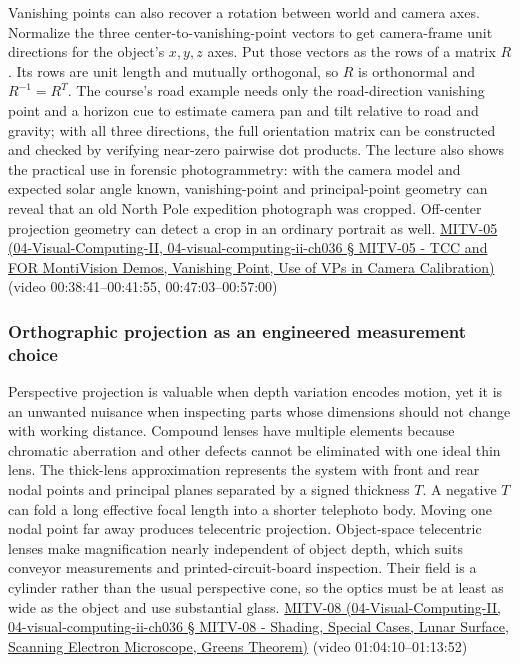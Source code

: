 Vanishing points can also recover a rotation between world and camera axes. Normalize the three center-to-vanishing-point vectors to get camera-frame unit directions for the object's \(x,y,z\) axes. Put those vectors as the rows of a matrix \(R\). Its rows are unit length and mutually orthogonal, so \(R\) is orthonormal and \(R^{-1}=R^T\). The course's road example needs only the road-direction vanishing point and a horizon cue to estimate camera pan and tilt relative to road and gravity; with all three directions, the full orientation matrix can be constructed and checked by verifying near-zero pairwise dot products. The lecture also shows the practical use in forensic photogrammetry: with the camera model and expected solar angle known, vanishing-point and principal-point geometry can reveal that an old North Pole expedition photograph was cropped. Off-center projection geometry can detect a crop in an ordinary portrait as well. \href{}{MITV-05 (04-Visual-Computing-II, 04-visual-computing-ii-ch036 § MITV-05 - TCC and FOR MontiVision Demos, Vanishing Point, Use of VPs in Camera Calibration)} (video 00:38:41--00:41:55, 00:47:03--00:57:00)

\subsubsection{Orthographic projection as an engineered measurement choice}\label{orthographic-projection-as-an-engineered-measurement-choice}

Perspective projection is valuable when depth variation encodes motion, yet it is an unwanted nuisance when inspecting parts whose dimensions should not change with working distance. Compound lenses have multiple elements because chromatic aberration and other defects cannot be eliminated with one ideal thin lens. The thick-lens approximation represents the system with front and rear nodal points and principal planes separated by a signed thickness \(T\). A negative \(T\) can fold a long effective focal length into a shorter telephoto body. Moving one nodal point far away produces telecentric projection. Object-space telecentric lenses make magnification nearly independent of object depth, which suits conveyor measurements and printed-circuit-board inspection. Their field is a cylinder rather than the usual perspective cone, so the optics must be at least as wide as the object and use substantial glass. \href{}{MITV-08 (04-Visual-Computing-II, 04-visual-computing-ii-ch036 § MITV-08 - Shading, Special Cases, Lunar Surface, Scanning Electron Microscope, Green\textquotesingle s Theorem)} (video 01:04:10--01:13:52)

